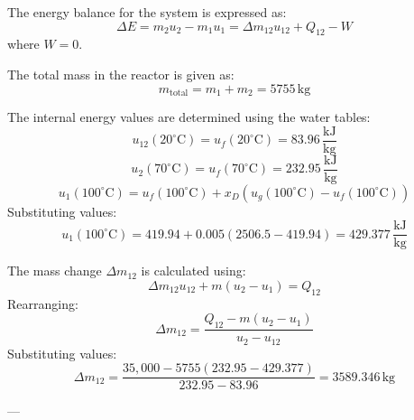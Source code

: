 The energy balance for the system is expressed as:  
\[
\Delta E = m_2 u_2 - m_1 u_1 = \Delta m_{12} u_{12} + Q_{12} - W
\]  
where \( W = 0 \).  

The total mass in the reactor is given as:  
\[
m_{\text{total}} = m_1 + m_2 = 5755 \, \text{kg}
\]  

The internal energy values are determined using the water tables:  
\[
u_{12}(20^\circ\text{C}) = u_f(20^\circ\text{C}) = 83.96 \, \frac{\text{kJ}}{\text{kg}}
\]  
\[
u_2(70^\circ\text{C}) = u_f(70^\circ\text{C}) = 232.95 \, \frac{\text{kJ}}{\text{kg}}
\]  
\[
u_1(100^\circ\text{C}) = u_f(100^\circ\text{C}) + x_D (u_g(100^\circ\text{C}) - u_f(100^\circ\text{C}))
\]  
Substituting values:  
\[
u_1(100^\circ\text{C}) = 419.94 + 0.005 (2506.5 - 419.94) = 429.377 \, \frac{\text{kJ}}{\text{kg}}
\]  

The mass change \( \Delta m_{12} \) is calculated using:  
\[
\Delta m_{12} u_{12} + m (u_2 - u_1) = Q_{12}
\]  
Rearranging:  
\[
\Delta m_{12} = \frac{Q_{12} - m (u_2 - u_1)}{u_2 - u_{12}}
\]  
Substituting values:  
\[
\Delta m_{12} = \frac{35,000 - 5755 (232.95 - 429.377)}{232.95 - 83.96} = 3589.346 \, \text{kg}
\]  

---
